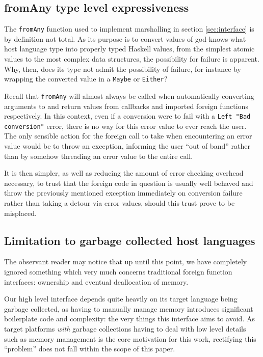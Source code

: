 \documentclass[preprint]{sigplanconf}
\begin{document}
\subsection{fromAny type level expressiveness}
The \lstinline!fromAny! function used to implement marshalling in section
\ref{sec:interface} is by definition not total. As its purpose is to
convert values of god-knows-what host language type into properly typed Haskell
values, from the simplest atomic values to the most complex data structures,
the possibility for failure is apparent. Why, then, does its type not admit
the possibility of failure, for instance by wrapping the converted value in a
\lstinline!Maybe! or \lstinline!Either!?

Recall that \lstinline!fromAny! will almost always be called when
automatically converting arguments to and return values from callbacks and
imported foreign functions respectively. In this context, even if a conversion
were to fail with a \lstinline!Left "Bad conversion"! error, there is no way
for this error value to ever reach the user. The only sensible action for the
foreign call to take when encountering an error value would be to throw an
exception, informing the user ``out of band'' rather than by somehow threading
an error value to the entire call.

It is then simpler, as well as reducing the amount of error checking overhead
necessary, to trust that the foreign code in question is usually well behaved
and throw the previously mentioned exception immediately on conversion failure
rather than taking a detour via error values,
should this trust prove to be misplaced.

\subsection{Limitation to garbage collected host languages}
\label{sec:host-gc}
The observant reader may notice that up until this point, we have completely
ignored something which very much concerns traditional foreign function
interfaces: ownership and eventual deallocation of memory.

Our high level interface depends quite heavily on its target language being
garbage collected, as having to manually manage memory introduces significant
boilerplate code and complexity: the very things this interface aims to avoid.
As target platforms \emph{with} garbage collections having to deal with low
level details such as memory management is the core motivation for this work,
rectifying this ``problem'' does not fall within the scope of this paper.
\end{document}
